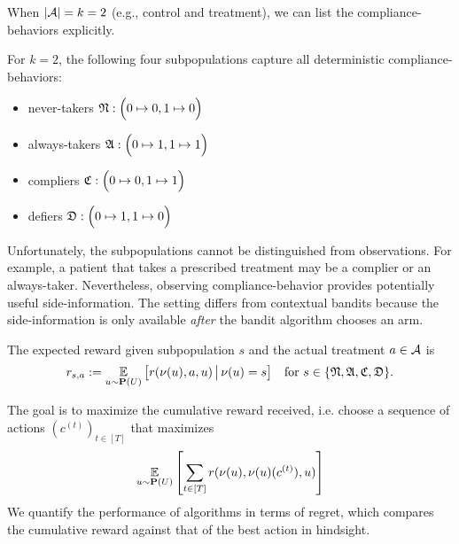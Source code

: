 When $|{\mathcal A}|=k=2$ (e.g., control and treatment), we can list the compliance-behaviors explicitly.
\begin{defn}\label{def:compliance_model}\eod
	For $k=2$, the following four subpopulations capture all deterministic compliance-behaviors:
	\begin{itemize}
		\item never-takers ${\mathfrak N}: \Big(0\mapsto 0, 1\mapsto 0\Big)$
		\item always-takers ${\mathfrak A}: \Big(0\mapsto 1, 1\mapsto 1\Big)$
		\item compliers ${\mathfrak C}: \Big( 0\mapsto 0, 1\mapsto 1\Big)$
		\item defiers ${\mathfrak D}: \Big(0\mapsto 1, 1\mapsto 0\Big)$
	\end{itemize}
\end{defn}
Unfortunately, the subpopulations cannot be distinguished from observations. For example, a patient that takes a prescribed treatment may be a complier or an always-taker. Nevertheless, observing compliance-behavior provides potentially useful side-information. The setting differs from contextual bandits because the side-information is only available \emph{after} the bandit algorithm chooses an arm.

\begin{defn}\label{def:reward_model}\eod
	The expected reward given subpopulation $s$ and the actual treatment $a\in{\mathcal A}$ is
	\begin{equation}
		r_{s,a} 
		:= \operatorname*{\mathbb E}_{u\sim {\mathbf P}(U)}\big[r(\nu(u),a,u)\,\big|\, \nu(u)=s\big]
		\quad\text{for }s\in \{{\mathfrak N}, {\mathfrak A},{\mathfrak C},{\mathfrak D}\}.
		\label{eq:exp_rew}		
	\end{equation}		
\end{defn}

The goal is to maximize the cumulative reward received,
i.e. choose a sequence of actions $(c^{(t)})_{t\in [T]}$ that maximizes 
\begin{equation}
   \operatorname*{\mathbb E}_{u\sim {\mathbf P}(U)}\left[\sum_{t\in[T]}r(\nu(u),\nu(u)(c^{(t)}), u)\right]
\end{equation}
We quantify the performance of algorithms in terms of regret, which compares the cumulative reward against that of the best action in hindsight.


